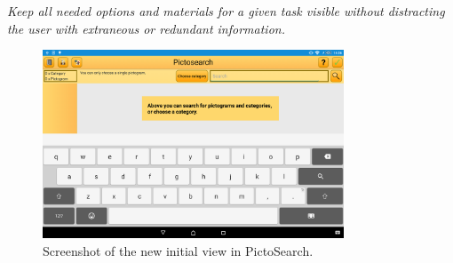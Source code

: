 \begin{displayquote}
\textit{Keep all needed options and materials for a given task visible without distracting the user with extraneous or redundant information.} \cite[p.~55]{DESIGNBOOK}
\end{displayquote}

\begin{figure}[ht]
    \centering
    \includegraphics[width=0.8\textwidth]{figures/img/screenshots/new_startup.png}
    \caption{Screenshot of the new initial view in PictoSearch.}\label{fig:screenshot_newstartup}
\end{figure}

